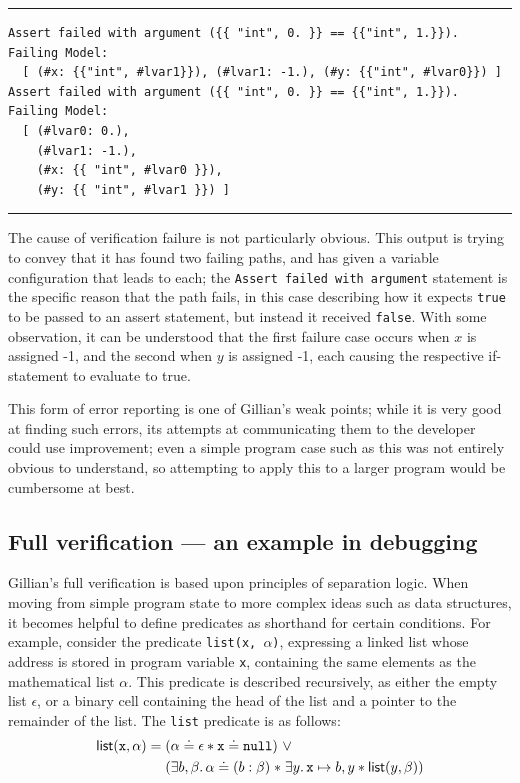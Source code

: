\noindent\rule{\textwidth}{0.5pt}
\vspace{-0.6cm}
\begin{verbatim}
Assert failed with argument ({{ "int", 0. }} == {{"int", 1.}}).
Failing Model:
  [ (#x: {{"int", #lvar1}}), (#lvar1: -1.), (#y: {{"int", #lvar0}}) ]
Assert failed with argument ({{ "int", 0. }} == {{"int", 1.}}).
Failing Model:
  [ (#lvar0: 0.),
    (#lvar1: -1.),
    (#x: {{ "int", #lvar0 }}),
    (#y: {{ "int", #lvar1 }}) ]
\end{verbatim}
\vspace{-0.4cm}
\noindent\rule{\textwidth}{0.5pt}
\vspace{-0.6cm}
\vspace{0.5cm}

The cause of verification failure is not particularly obvious. This output is
trying to convey that it has found two failing paths, and has given a variable
configuration that leads to each; the \texttt{Assert failed with argument}
statement is the specific reason that the path fails, in this case describing
how it expects \texttt{true} to be passed to an assert statement, but instead it
received \texttt{false}. With some observation, it can be understood that the
first failure case occurs when $x$ is assigned -1, and the second when $y$ is
assigned -1, each causing the respective if-statement to evaluate to true.

This form of error reporting is one of Gillian's weak points; while it is very
good at finding such errors, its attempts at communicating them to the
developer could use improvement; even a simple program case such as this was
not entirely obvious to understand, so attempting to apply this to a larger
program would be cumbersome at best.

\subsection{Full verification --- an example in debugging}

Gillian's full verification is based upon principles of separation logic. When
moving from simple program state to more complex ideas such as data structures,
it becomes helpful to define predicates as shorthand for certain conditions.
For example, consider the predicate \texttt{list(x, $\alpha$)}, expressing a
linked list whose address is stored in program variable \texttt{x}, containing
the same elements as the mathematical list $\alpha$. This predicate is described
recursively, as either the empty list $\epsilon$, or a binary cell containing
the head of the list and a pointer to the remainder of the list. The
\texttt{list} predicate is as follows:
\begin{align*}
  \mathsf{list}(\mathtt{x}, \alpha) =\; &(\alpha \doteq \epsilon \ast \mathtt{x} \doteq \mathtt{null})~\lor\\
  & (\exists b, \beta \ldotp \alpha \doteq (b : \beta) \mathrel{*} \exists y \ldotp \mathtt{x} \mapsto b, y \ast \mathsf{list}(y, \beta))
\end{align*}

